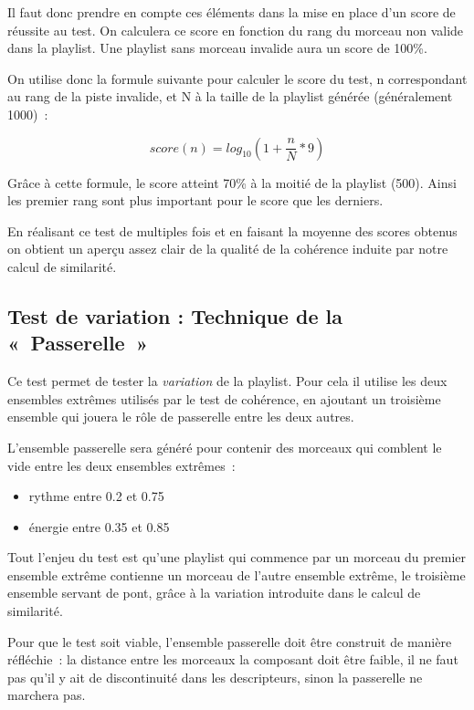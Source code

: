 Il faut donc prendre en compte ces éléments dans la mise en place d'un score de
réussite au test. On calculera ce score en fonction du rang du morceau non
valide dans la playlist. Une playlist sans morceau invalide aura un score de
100\%.

On utilise donc la formule suivante pour calculer le score du test, n
correspondant au rang de la piste invalide, et N à la taille de la playlist
générée (généralement 1000)~:

\begin{equation*}
  score(n) = log_{10}(1 + \frac{n}{N} * 9)
\end{equation*}

Grâce à cette formule, le score atteint 70\% à la moitié de la playlist (500).
Ainsi les premier rang sont plus important pour le score que les derniers.

En réalisant ce test de multiples fois et en faisant la moyenne des scores
obtenus on obtient un aperçu assez clair de la qualité de la cohérence induite
par notre calcul de similarité.

\subsection{Test de variation : Technique de la «~Passerelle~»}
\label{tests:qualite:variation-passerelle}

Ce test permet de tester la \emph{variation} de la playlist. Pour cela il
utilise les deux ensembles extrêmes utilisés par le test de cohérence, en 
ajoutant un troisième ensemble qui jouera le rôle de passerelle entre les
deux autres.

L'ensemble passerelle sera généré pour contenir des morceaux qui comblent le
vide entre les deux ensembles extrêmes~:

\begin{itemize}
  \item rythme entre 0.2 et 0.75
  \item énergie entre 0.35 et 0.85
\end{itemize}

Tout l'enjeu du test est qu'une playlist qui commence par un morceau du premier
ensemble extrême contienne un morceau de l'autre ensemble extrême, le troisième
ensemble servant de pont, grâce à la variation introduite dans le calcul de
similarité.

Pour que le test soit viable, l'ensemble passerelle doit être construit de
manière réfléchie~: la distance entre les morceaux la composant doit être faible,
il ne faut pas qu'il y ait de discontinuité dans les descripteurs, sinon la
passerelle ne marchera pas.

